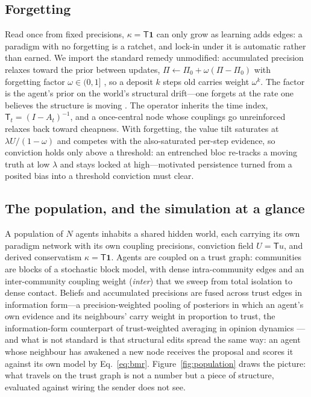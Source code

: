 \documentclass[11pt]{article}
\newcommand{\Top}{\mathsf{T}}          %
\newcommand{\bone}{\mathbf{1}}         %
\begin{document}
\subsection{Forgetting}
\label{sec:temporal}

Read once from fixed precisions, $\kappa=\Top\bone$ can only grow as learning adds edges: a paradigm
with no forgetting is a ratchet, and lock-in under it is automatic rather than earned. We import the
standard remedy unmodified: accumulated precision relaxes toward the prior between updates,
$\Pi\leftarrow\Pi_0+\omega(\Pi-\Pi_0)$ with forgetting factor $\omega\in(0,1]$
\citep{friston2017process,smith2022tutorial}, so a deposit $k$ steps old carries weight $\omega^k$.
The factor is the agent's prior on the world's structural drift---one forgets at the rate one believes
the structure is moving \citep{mathys2011}. The operator inherits the time index,
$\Top_t=(I-A_t)^{-1}$, and a once-central node whose couplings go unreinforced relaxes back toward
cheapness. With forgetting, the value tilt saturates at $\lambda U/(1-\omega)$ and competes with the
also-saturated per-step evidence, so conviction holds only above a threshold: an entrenched bloc
re-tracks a moving truth at low $\lambda$ and stays locked at high---motivated persistence turned
from a posited bias into a threshold conviction must clear.

\subsection{The population, and the simulation at a glance}
\label{sec:model}

A population of $N$ agents inhabits a shared hidden world, each carrying its own paradigm network
with its own coupling precisions, conviction field $U=\Top u$, and derived conservatism
$\kappa=\Top\bone$. Agents are coupled on a trust graph: communities are blocks of a stochastic block
model, with dense intra-community edges and an inter-community coupling weight (\emph{inter}) that we
sweep from total isolation to dense contact. Beliefs and accumulated precisions are fused across
trust edges in information form---a precision-weighted pooling of posteriors in which an agent's own
evidence and its neighbours' carry weight in proportion to trust, the information-form counterpart
of trust-weighted averaging in opinion dynamics \citep{degroot1974,acemoglu2011}---and what is not
standard is that structural edits spread the same way: an agent whose neighbour has awakened a new node receives the proposal and scores it
against its own model by Eq.~\eqref{eq:bmr}. Figure~\ref{fig:population} draws the picture: what
travels on the trust graph is not a number but a piece of structure, evaluated against wiring the
sender does not see.
\end{document}
